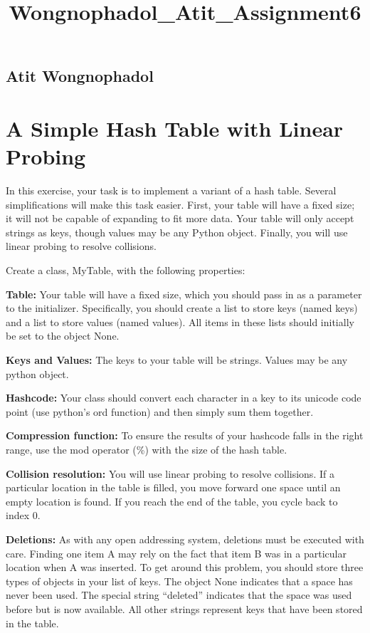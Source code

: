 \documentclass[11pt]{article}
\title{Wongnophadol\_Atit\_Assignment6}
\begin{document}
    
    
    \maketitle
    
    

    
    \subsection{Atit Wongnophadol}\label{atit-wongnophadol}

    \section{A Simple Hash Table with Linear
Probing}\label{a-simple-hash-table-with-linear-probing}

In this exercise, your task is to implement a variant of a hash table.
Several simplifications will make this task easier. First, your table
will have a fixed size; it will not be capable of expanding to fit more
data. Your table will only accept strings as keys, though values may be
any Python object. Finally, you will use linear probing to resolve
collisions.

Create a class, MyTable, with the following properties:

\textbf{Table:} Your table will have a fixed size, which you should pass
in as a parameter to the initializer. Specifically, you should create a
list to store keys (named keys) and a list to store values (named
values). All items in these lists should initially be set to the object
None.

\textbf{Keys and Values:} The keys to your table will be strings. Values
may be any python object.

\textbf{Hashcode:} Your class should convert each character in a key to
its unicode code point (use python's ord function) and then simply sum
them together.

\textbf{Compression function:} To ensure the results of your hashcode
falls in the right range, use the mod operator (\%) with the size of the
hash table.

\textbf{Collision resolution:} You will use linear probing to resolve
collisions. If a particular location in the table is filled, you move
forward one space until an empty location is found. If you reach the end
of the table, you cycle back to index 0.

\textbf{Deletions:} As with any open addressing system, deletions must
be executed with care. Finding one item A may rely on the fact that item
B was in a particular location when A was inserted. To get around this
problem, you should store three types of objects in your list of keys.
The object None indicates that a space has never been used. The special
string ``deleted'' indicates that the space was used before but is now
available. All other strings represent keys that have been stored in the
table.
\end{document}
